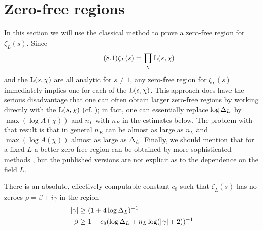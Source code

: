 \documentclass[./main]{subfiles}
\begin{document}
\section{Zero-free regions}
In this section we will use the classical method to prove a zero-free region for $\zeta_L(s)$. Since 
\[\tag{8.1}\label{(8.1)} \zeta_L(s) = \prod_{\chi} \operatorname{L}(s, \chi)
\]
and the $\operatorname{L}(s, \chi)$ are all analytic for $s \neq 1$, any zero-free region for $\zeta_L(s)$ immediately implies one for each of the $\operatorname{L}(s, \chi)$. This approach does have the serious disadvantage that one can often obtain larger zero-free regions by working directly with the $\operatorname{L}(s, \chi)$ (cf. \cite[Ch. 14]{2-davenport2013multiplicative}); in fact, one can essentially replace $\log \Delta_L$ by $\max(\log A(\chi))$ and $n_L$ with $n_E$ in the estimates below. The problem with that result is that in general $n_E$ can be almost as large as $n_L$ and $\max(\log A(\chi))$ almost as large as $\Delta_L$. Finally, we should mention that for a fixed $L$ a better zero-free region can be obtained by more sophisticated methods \cite{12-Sokolovskii}, but the published versions are not explicit as to the dependence on the field $L$.
\begin{lemma}\label{8.1}
There is an absolute, effectively computable constant $c_8$ such that $\zeta_L(s)$ has no zeroes $\rho = \beta + i \gamma$ in the region 
\begin{align*}
|\gamma| &\geq (1 + 4\log \Delta_L)^{-1} \\
\beta &\geq 1 - c_8(\log \Delta_L + n_L \log(|\gamma| + 2))^{-1}
\end{align*}
\end{lemma}
\end{document}
